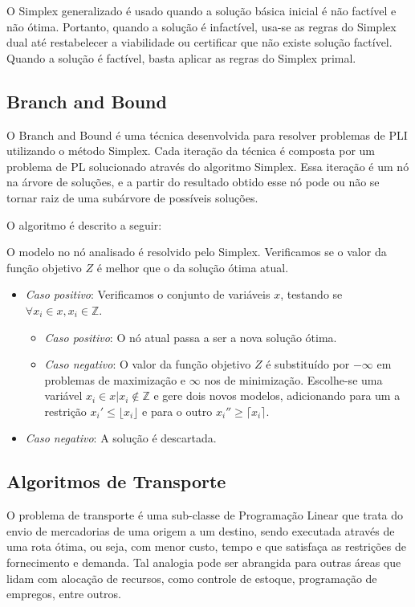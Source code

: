 \documentclass [11pt]{articleSBPO}
\begin{document}
O Simplex generalizado é usado quando a solução básica inicial é não factível e não ótima. Portanto, quando a solução é infactível, usa-se as regras do Simplex dual até restabelecer a viabilidade ou certificar que não existe solução factível. Quando a solução é factível, basta aplicar as regras do Simplex primal.

\subsection{Branch and Bound}\label{subsec:bnb}

O Branch and Bound é uma técnica desenvolvida para resolver problemas de PLI utilizando o método Simplex. Cada iteração da técnica é composta por um problema de PL solucionado através do algoritmo Simplex. Essa iteração é um nó na árvore de soluções, e a partir do resultado obtido esse nó pode ou não se tornar raiz de uma subárvore de possíveis soluções.

O algoritmo é descrito a seguir:

\bigskip

\noindent O modelo no nó analisado é resolvido pelo Simplex. Verificamos se o valor da função objetivo $Z$ é melhor que o da solução ótima atual.
\begin{itemize}
	\item \textit{Caso positivo}: Verificamos o conjunto de variáveis $x$, testando se $\forall  x_{i} \in x, x_{i} \in \mathbb{Z}$.
	\begin{itemize}
		\item \textit{Caso positivo}: O nó atual passa a ser a nova solução ótima.
		\item \textit{Caso negativo}: O valor da função objetivo $Z$ é substituído por $-\infty$ em problemas de maximização e $\infty$ nos de minimização. Escolhe-se uma variável $x_{i} \in x | x_{i} \notin \mathbb{Z}$ e gere dois novos modelos, adicionando para um a restrição $x_{i}' \leq \lfloor x_{i} \rfloor$ e para o outro $x_{i}'' \geq \lceil x_{i} \rceil$.
	\end{itemize}
	\item \textit{Caso negativo}: A solução é descartada. 
\end{itemize}

\subsection{Algoritmos de Transporte}\label{subsec:transporte}

O problema de transporte é uma sub-classe de Programação Linear que trata do envio de mercadorias de uma origem a um destino, sendo executada através de uma rota ótima, ou seja, com menor custo, tempo e que satisfaça as restrições de fornecimento e demanda. Tal analogia pode ser abrangida para outras áreas que lidam com alocação de recursos, como controle de estoque, programação de empregos, entre outros.
\end{document}
